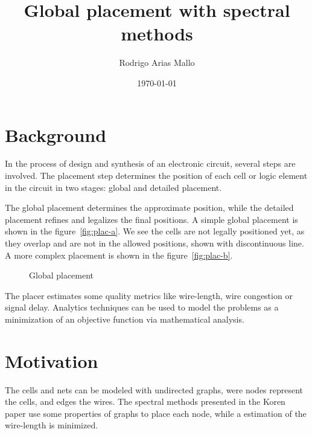 \documentclass[a4paper,twocolumn]{article}
\title{Global placement with spectral methods}
\author{Rodrigo Arias Mallo}
\date{\today}
\begin{document}
\maketitle
%

\section{Background}
In the process of design and synthesis of an electronic circuit, several steps 
are involved. The placement step determines the position of each cell or logic 
element in the circuit in two stages: global and detailed placement.

The global placement determines the approximate position, while the detailed 
placement refines and legalizes the final positions. A simple global placement 
is shown in the figure~\ref{fig:plac-a}. We see the cells are not legally 
positioned yet, as they overlap and are not in the allowed positions, shown with 
discontinuous line. A more complex placement is shown in the 
figure~\ref{fig:plac-b}.
%
\begin{figure}[h]
	\centering
	\caption{Global placement}
	\label{fig:plac}
\end{figure}

The placer estimates some quality metrics like wire-length, wire congestion or 
signal delay. Analytics techniques can be used to model the problems as a 
minimization of an objective function via mathematical analysis.

\section{Motivation}

The cells and nets can be modeled with undirected graphs, were nodes represent 
the cells, and edges the wires. The spectral methods presented in the 
Koren~\cite{koren} paper use some properties of graphs to place each node, while 
a estimation of the wire-length is minimized.
\end{document}
